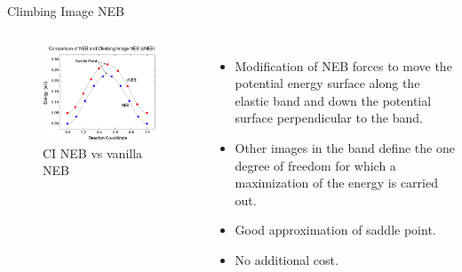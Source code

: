 \documentclass[aspectratio=169]{beamer}
\begin{document}
    \begin{frame}{Climbing Image NEB}
        \begin{columns}

            \begin{figure}
                \centering
                \includegraphics[width=\linewidth]{lectures/figures/12-CINEB.png}
                \caption{CI NEB vs vanilla NEB}
            \end{figure}

            \begin{itemize}
                \item Modification of NEB forces to move the potential energy surface along the elastic band and down the potential surface perpendicular to the band.\cite{henkelmanClimbingImageNudged2000}
                \item Other images in the band define the one degree of freedom for which a maximization of the energy is carried out.
                \item Good approximation of saddle point.
                \item No additional cost.
            \end{itemize}
        \end{columns}
    \end{frame}
\end{document}
